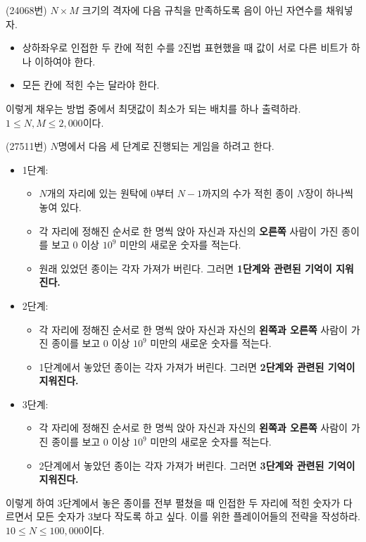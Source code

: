\begin{problem}
    (24068번) $N \times M$ 크기의 격자에 다음 규칙을 만족하도록 음이 아닌 자연수를 채워넣자.
    \begin{itemize}
        \item 상하좌우로 인접한 두 칸에 적힌 수를 $2$진법 표현했을 때 값이 서로 다른 비트가 하나 이하여야 한다.
        \item 모든 칸에 적힌 수는 달라야 한다.
    \end{itemize}
    이렇게 채우는 방법 중에서 최댓값이 최소가 되는 배치를 하나 출력하라. $1 \leq N, M \leq 2,000$이다.
\end{problem}

\begin{problem}
    (27511번) $N$명에서 다음 세 단계로 진행되는 게임을 하려고 한다.
    \begin{itemize}
        \item 1단계:
        \begin{itemize}
            \item $N$개의 자리에 있는 원탁에 $0$부터 $N-1$까지의 수가 적힌 종이 $N$장이 하나씩 놓여 있다.
            \item 각 자리에 정해진 순서로 한 명씩 앉아 자신과 자신의 \textbf{오른쪽} 사람이 가진 종이를 보고 $0$ 이상 $10^9$ 미만의 새로운 숫자를 적는다.
            \item 원래 있었던 종이는 각자 가져가 버린다. 그러면 \textbf{1단계와 관련된 기억이 지워진다.}
        \end{itemize}
        \item 2단계:
        \begin{itemize}
            \item 각 자리에 정해진 순서로 한 명씩 앉아 자신과 자신의 \textbf{왼쪽과 오른쪽} 사람이 가진 종이를 보고 $0$ 이상 $10^9$ 미만의 새로운 숫자를 적는다.
            \item 1단계에서 놓았던 종이는 각자 가져가 버린다. 그러면 \textbf{2단계와 관련된 기억이 지워진다.}
        \end{itemize}
        \item 3단계:
        \begin{itemize}
            \item 각 자리에 정해진 순서로 한 명씩 앉아 자신과 자신의 \textbf{왼쪽과 오른쪽} 사람이 가진 종이를 보고 $0$ 이상 $10^9$ 미만의 새로운 숫자를 적는다.
            \item 2단계에서 놓았던 종이는 각자 가져가 버린다. 그러면 \textbf{3단계와 관련된 기억이 지워진다.}
        \end{itemize}
    \end{itemize}
    이렇게 하여 3단계에서 놓은 종이를 전부 펼쳤을 때 인접한 두 자리에 적힌 숫자가 다르면서 모든 숫자가 $3$보다 작도록 하고 싶다. 이를 위한 플레이어들의 전략을 작성하라. $10 \leq N \leq 100,000$이다.
\end{problem}

